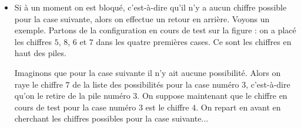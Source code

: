 \documentclass[11pt,class=report,crop=false]{standalone}
\begin{document}
\begin{cours}
\begin{itemize}
    \smallskip
    
      \item Si à un moment on est bloqué, c'est-à-dire qu'il n'y a aucun chiffre possible pour la case suivante, alors on effectue un retour en arrière.
Voyons un exemple. Partons de la configuration en cours de test sur la figure : on a placé les chiffres $5$, $8$, $6$ et $7$ dans les quatre premières cases. Ce sont les chiffres en haut des piles.

Imaginons que pour la case suivante il n'y ait aucune possibilité. Alors 
on raye le chiffre $7$ de la liste des possibilités pour la case numéro $3$, 
c'est-à-dire qu'on le retire de la pile numéro 3.
On suppose maintenant que le chiffre en cours de test pour la case numéro $3$ est le chiffre $4$.
On repart en avant en cherchant les chiffres possibles pour la case suivante...

     \smallskip
     
   
\end{itemize}
\end{cours}
\end{document}
